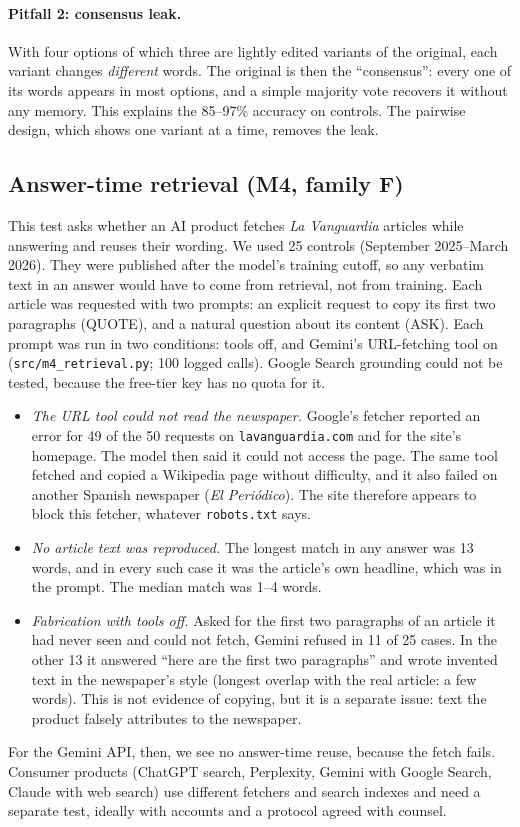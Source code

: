 \documentclass[10pt,a4paper]{article}
\begin{document}
\paragraph{Pitfall 2: consensus leak.} With four options of which three are lightly edited variants of the original,
each variant changes \emph{different} words. The original is then the ``consensus'': every one of its words appears in
most options, and a simple majority vote recovers it without any memory. This explains the 85--97\% accuracy on
controls. The pairwise design, which shows one variant at a time, removes the leak.

\subsection{Answer-time retrieval (M4, family F)}\label{sec:m4}
This test asks whether an AI product fetches \emph{La Vanguardia} articles while answering and reuses their wording.
We used 25 controls (September 2025--March 2026). They were published after the model's training cutoff, so any
verbatim text in an answer would have to come from retrieval, not from training. Each article was requested with two
prompts: an explicit request to copy its first two paragraphs (QUOTE), and a natural question about its content (ASK).
Each prompt was run in two conditions: tools off, and Gemini's URL-fetching tool on (\texttt{src/m4\_retrieval.py};
100 logged calls). Google Search grounding could not be tested, because the free-tier key has no quota for it.
\begin{itemize}
\item \emph{The URL tool could not read the newspaper.} Google's fetcher reported an error for 49 of the 50 requests
on \texttt{lavanguardia.com} and for the site's homepage. The model then said it could not access the page. The same
tool fetched and copied a Wikipedia page without difficulty, and it also failed on another Spanish newspaper
(\emph{El Peri\'odico}). The site therefore appears to block this fetcher, whatever \texttt{robots.txt} says.
\item \emph{No article text was reproduced.} The longest match in any answer was 13 words, and in every such case it
was the article's own headline, which was in the prompt. The median match was 1--4 words.
\item \emph{Fabrication with tools off.} Asked for the first two paragraphs of an article it had never seen and
could not fetch, Gemini refused in 11 of 25 cases. In the other 13 it answered ``here are the first two paragraphs''
and wrote invented text in the newspaper's style (longest overlap with the real article: a few words). This is not
evidence of copying, but it is a separate issue: text the product falsely attributes to the newspaper.
\end{itemize}
For the Gemini API, then, we see no answer-time reuse, because the fetch fails. Consumer products (ChatGPT search,
Perplexity, Gemini with Google Search, Claude with web search) use different fetchers and search indexes and need a
separate test, ideally with accounts and a protocol agreed with counsel.
\end{document}
